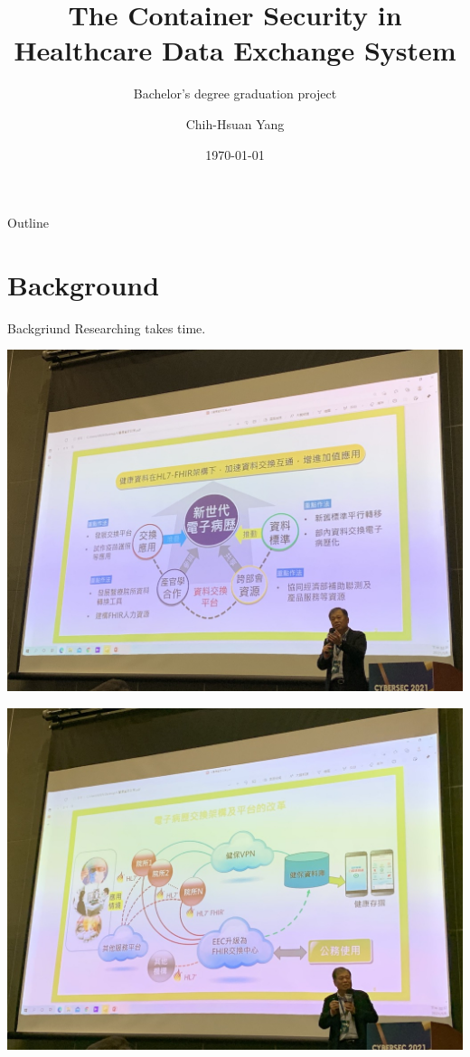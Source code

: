 \documentclass{beamer}
\title{The Container Security in Healthcare Data Exchange System}
\subtitle{Bachelor's degree graduation project}
\author{Chih-Hsuan Yang}
\institute{National Sun Yat-sen University\\
Advisor: Chun-I Fan
}
\date{\today}
\begin{document}
\begin{CJK*}{UTF8}{bsmi}

    \begin{frame}
        \titlepage
    \end{frame}

    \begin{frame}{Outline}
        \begin{multicols}{2}
            \tableofcontents
        \end{multicols}
    \end{frame}

    \section{Background}
    \begin{frame}{Backgriund}
        \centering \Huge
        Researching takes time.
    \end{frame}

    \begin{frame}
        \includegraphics[width=\textwidth]{IMG_6551.jpg}
    \end{frame}

    \begin{frame}
        \includegraphics[width=\textwidth]{IMG_6549.jpg}
    \end{frame}


\end{CJK*}
\end{document}
